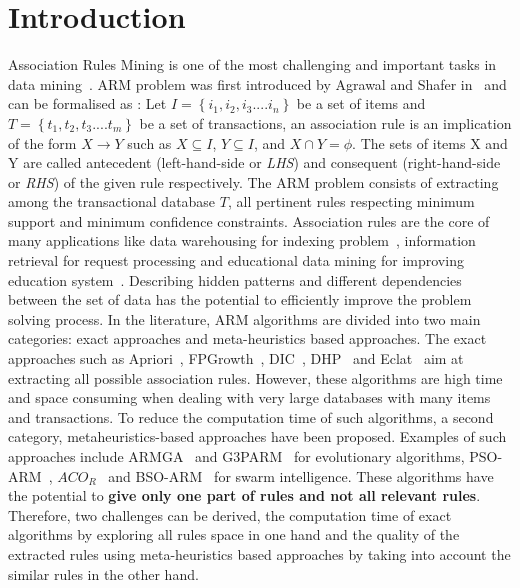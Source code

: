\documentclass[preprint,12pt]{elsarticle}
\begin{document}
\section{Introduction}
 Association Rules Mining is one of the most challenging and important tasks in data mining~\cite{1}. 
 ARM problem was first introduced by Agrawal and Shafer in~\cite{2} and can be formalised as :
 Let $I=\left\{i_{1},i_{2},i_{3}....i_{n}\right\}$ be a set of items and $T =\left\{t_{1},t_{2},t_{3}....t_{m}\right\}$ be a set of transactions, 
 an association rule is an implication of the form 
 $X \rightarrow Y$ such as $X \subseteq  I$, $Y \subseteq I$, and $X \cap Y = \phi$. 
The sets of items X and Y are called antecedent (left-hand-side or \textit{LHS}) and consequent (right-hand-side or \textit{RHS}) of the given rule 
respectively. The ARM problem consists of extracting among the transactional database $T$, 
all pertinent rules respecting minimum support and minimum confidence constraints. Association rules are the core of many applications like data warehousing for indexing problem~\cite{3},
information retrieval for request processing and educational data mining for improving education system~\cite{4}. Describing hidden patterns 
and different dependencies between the set of data has the potential to efficiently improve
the problem solving process. In the literature, ARM algorithms are divided into two main categories: exact approaches and 
meta-heuristics based approaches. The exact approaches such as Apriori~\cite{5}, FPGrowth~\cite{6}, DIC~\cite{7}, DHP~\cite{8} and Eclat~\cite{9} aim at extracting all possible association rules. However, these algorithms are high time and space consuming when dealing with very large databases with many items and transactions. 
To reduce the computation time of such algorithms, a second category, metaheuristics-based approaches have been proposed. Examples of such approaches include ARMGA~\cite{10} and G3PARM~\cite{11} for evolutionary algorithms, PSO-ARM~\cite{12}, $ACO_R$~\cite{13} and BSO-ARM~\cite{14} 
for swarm intelligence. These algorithms have the potential to \textbf{give only one part of rules and not all relevant rules}. Therefore, two challenges can be derived, the computation time of exact algorithms by exploring all rules space in one hand and the quality of the extracted rules using meta-heuristics based approaches by taking into account the similar rules in the other hand. \\
\end{document}
